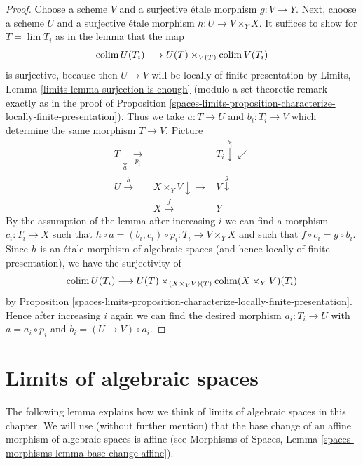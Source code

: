 \begin{proof}
Choose a scheme $V$ and a surjective \'etale morphism $g : V \to Y$.
Next, choose a scheme $U$ and a surjective \'etale morphism
$h : U \to V \times_Y X$. It suffices to show for $T = \lim T_i$
as in the lemma that the map
$$
\operatorname{colim} U(T_i) \longrightarrow U(T) \times_{V(T)} \operatorname{colim} V(T_i)
$$
is surjective, because then $U \to V$ will be locally of finite
presentation by Limits, Lemma \ref{limits-lemma-surjection-is-enough}
(modulo a set theoretic remark exactly as in the proof of
Proposition \ref{spaces-limits-proposition-characterize-locally-finite-presentation}).
Thus we take $a : T \to U$ and $b_i : T_i \to V$ which determine
the same morphism $T \to V$. Picture
$$
\begin{array}{ccc}T \underset{a}{\downarrow}\underset{p_i}{\longrightarrow} &  & T_i \overset{b_i}{\downarrow}\swarrow \\ U \overset{h}{\longrightarrow} & X \times_Y V \downarrow\longrightarrow & V \overset{g}{\downarrow} \\  & X \overset{f}{\longrightarrow} & Y\end{array}
$$
By the assumption of the lemma after increasing $i$
we can find a morphism $c_i : T_i \to X$ such that
$h \circ a = (b_i, c_i) \circ p_i : T_i \to V \times_Y X$
and such that $f \circ c_i = g \circ b_i$.
Since $h$ is an \'etale morphism of algebraic spaces
(and hence locally of finite presentation), we have the surjectivity of
$$
\operatorname{colim} U(T_i) \longrightarrow U(T) \times_{(X \times_Y V)(T)}
\operatorname{colim} (X \times_Y V)(T_i)
$$
by Proposition \ref{spaces-limits-proposition-characterize-locally-finite-presentation}.
Hence after increasing $i$ again we can find the desired
morphism $a_i : T_i \to U$ with $a = a_i \circ p_i$ and
$b_i = (U \to V) \circ a_i$.
\end{proof}

\section{Limits of algebraic spaces}
\label{spaces-limits-section-limits}
The following lemma explains how we think of limits of algebraic
spaces in this chapter. We will use (without further mention) that the
base change of an affine morphism of algebraic spaces is affine (see
Morphisms of Spaces, Lemma \ref{spaces-morphisms-lemma-base-change-affine}).

